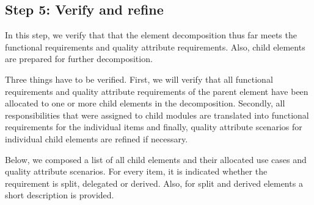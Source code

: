 \subsection{Step 5: Verify and refine}
\label{add:it1/verification}

\npar In this step, we verify that that the element decomposition thus far meets
the functional requirements and quality attribute requirements. Also, child
elements are prepared for further decomposition.

\npar Three things have to be verified. First, we will verify that all
functional requirements and quality attribute requirements of the parent element
have been allocated to one or more child elements in the decomposition.
Secondly, all responsibilities that were assigned to child modules are
translated into functional requirements for the individual items and finally,
quality attribute scenarios for individual child elements are refined if
necessary.

\npar Below, we composed a list of all child elements and their allocated use
cases and quality attribute scenarios. For every item, it is indicated whether
the requirement is split, delegated or derived. Also, for split and derived
elements a short description is provided.

